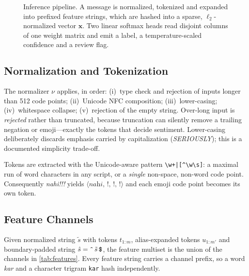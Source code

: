 \documentclass[11pt,a4paper]{article}
\theoremstyle{remark}
\newcommand{\hi}[1]{\textit{#1}}                       %
\newcommand{\R}{\mathbb{R}}
\newcommand{\x}{\bm{x}}
\newcommand{\z}{\bm{z}}
\DeclareMathOperator{\softmax}{softmax}
\begin{document}
\begin{figure}[t]
\caption{Inference pipeline. A message is normalized, tokenized and expanded
into prefixed feature strings, which are hashed into a sparse,
$\ell_2$-normalized vector $\x$. Two linear softmax heads read disjoint columns
of one weight matrix and emit a label, a temperature-scaled confidence and a
review flag.}
\label{fig:arch}
\end{figure}

\subsection{Normalization and Tokenization}
\label{sec:norm}

The normalizer $\nu$ applies, in order: (i)~type check and rejection of inputs
longer than 512 code points; (ii)~Unicode NFC composition; (iii)~lower-casing;
(iv)~whitespace collapse; (v)~rejection of the empty string. Over-long input is
\emph{rejected} rather than truncated, because truncation can silently remove
a trailing negation or emoji---exactly the tokens that decide sentiment.
Lower-casing deliberately discards emphasis carried by capitalization
(\hi{SERIOUSLY}); this is a documented simplicity trade-off.

Tokens are extracted with the Unicode-aware pattern \verb!\w+|[^\w\s]!: a
maximal run of word characters in any script, or a \emph{single} non-space,
non-word code point. Consequently \hi{nahi!!!} yields
$\langle\hi{nahi},\,!,\,!,\,!\rangle$ and each emoji code point becomes its own
token. 

\subsection{Feature Channels}
\label{sec:features}

Given normalized string $\tilde s$ with tokens $t_{1:m}$, alias-expanded tokens
$u_{1:m'}$ and boundary-padded string $\hat s = {\texttt{\^{}}}\,\tilde s\,\texttt{\$}$, the
feature multiset is the union of the channels in \cref{tab:features}. Every
feature string carries a channel prefix, so a word \hi{kar} and a character
trigram \texttt{kar} hash independently.
\end{document}

